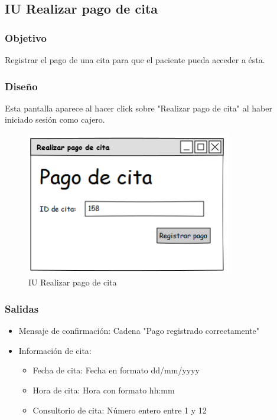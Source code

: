 \subsection{IU Realizar pago de cita}

\subsubsection{Objetivo}
Registrar el pago de una cita para que el paciente pueda acceder a ésta.

\subsubsection{Diseño}
Esta pantalla aparece al hacer click sobre "Realizar pago de cita" al haber iniciado sesión como cajero.

\begin{figure}[htbp!]
	\centering
	\includegraphics[width=0.8\textwidth]{images/IU_pagar_cita}
	\caption{IU Realizar pago de cita}
\end{figure}


\subsubsection{Salidas}
\begin{itemize}
	\item Mensaje de confirmación: Cadena "Pago registrado correctamente"
	\item Información de cita:
	\begin{itemize}
		\item Fecha de cita: Fecha en formato dd/mm/yyyy
		\item Hora de cita: Hora con formato hh:mm
		\item Consultorio de cita: Número entero entre 1 y 12
	\end{itemize}
\end{itemize}
